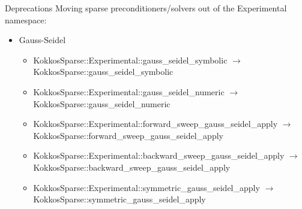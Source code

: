 \begin{frame}[fragile]{Deprecations}
  Moving sparse preconditioners/solvers out of the {\ttfamily Experimental} namespace:
  \begin{itemize}
  \item Gauss-Seidel
    \begin{itemize}
    \item {\ttfamily KokkosSparse::Experimental::gauss\_seidel\_symbolic} $\rightarrow$ {\ttfamily KokkosSparse::gauss\_seidel\_symbolic}
    \item {\ttfamily KokkosSparse::Experimental::gauss\_seidel\_numeric} $\rightarrow$ {\ttfamily KokkosSparse::gauss\_seidel\_numeric}
    \item {\ttfamily KokkosSparse::Experimental::forward\_sweep\_gauss\_seidel\_apply} $\rightarrow$ {\ttfamily KokkosSparse::forward\_sweep\_gauss\_seidel\_apply}
    \item {\ttfamily KokkosSparse::Experimental::backward\_sweep\_gauss\_seidel\_apply} $\rightarrow$ {\ttfamily KokkosSparse::backward\_sweep\_gauss\_seidel\_apply}
    \item {\ttfamily KokkosSparse::Experimental::symmetric\_gauss\_seidel\_apply} $\rightarrow$ {\ttfamily KokkosSparse::symmetric\_gauss\_seidel\_apply}
    \end{itemize}
  \end{itemize}
\end{frame}
